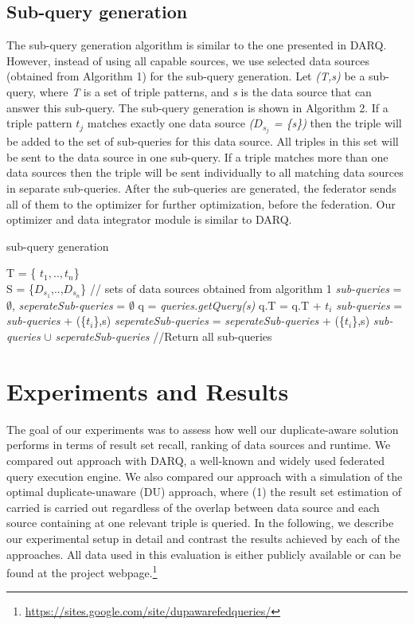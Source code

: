 \documentclass{sig-alternate}  %
\begin{document}
\subsection{Sub-query generation}
 The sub-query generation algorithm is similar to the one presented in DARQ. However, instead of using all capable sources, we use selected data sources (obtained from Algorithm 1) for the sub-query generation. Let \emph{(T,s)} be a sub-query, where \emph{T} is a set of triple patterns, and \emph{s} is the data source that can answer this sub-query. The sub-query generation is shown in Algorithm 2. If a triple pattern \emph{$t_j$} matches exactly one data source \emph{($D_{s_j}$ = \{s\})} then the triple will be added to the set of sub-queries for this data source. All triples in this set will be sent to the data source in one sub-query. If a triple matches more than one data sources then the triple will be sent individually to all matching data sources
in separate sub-queries. After the sub-queries are generated, the federator sends all of them to the optimizer for further optimization, before the federation. Our optimizer and data integrator module is similar to DARQ. 
\begin{algorithm}
\caption{sub-query generation}
\begin{algorithmic} [1]
\REQUIRE T = \{ $t_1,..,t_n$\} \\
 S = \{$D_{s_1}$,..,$D_{s_n}$\} // sets of data sources obtained from algorithm 1  
\STATE \emph{sub-queries} = $\emptyset$, \emph{seperateSub-queries} = $\emptyset$
\STATE q = \emph{queries.getQuery(s)}
\STATE q.T = q.T + $t_i$
\ELSE 
\STATE \emph{sub-queries} = \emph{sub-queries} + (\{$t_i$\},s)
\ENDIF
\ELSE 
{}
\STATE \emph{seperateSub-queries} = \emph{seperateSub-queries} + (\{$t_i$\},s)
\ENDFOR
\ENDIF
\ENDFOR
\RETURN \emph{sub-queries} $\cup$ \emph{seperateSub-queries} //Return all sub-queries
\end{algorithmic}
\end{algorithm}
\section{Experiments and Results}
The goal of our experiments was to assess how well our duplicate-aware solution performs in terms of result set recall, ranking of data sources and runtime.
We compared out approach with DARQ, a well-known and widely used federated query execution engine.
We also compared our approach with a simulation of the optimal duplicate-unaware (DU) approach, where (1) the result set estimation of carried is carried out regardless of the overlap between data source and each source containing at one relevant triple is queried.
In the following, we describe our experimental setup in detail and contrast the results achieved by each of the approaches.
All data used in this evaluation is either publicly available or can be found at the project webpage.\footnote{\url{https://sites.google.com/site/dupawarefedqueries/}}
\end{document}
